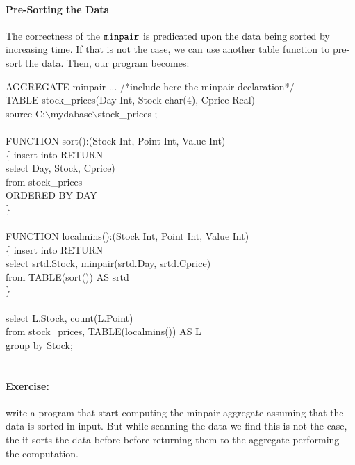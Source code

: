 \paragraph{Pre-Sorting the Data}
The correctness of the $\tt minpair$ is predicated upon the data
being sorted by increasing time. If that is not the case, we can
use another table function to pre-sort the data. Then, our program
becomes:
\begin{codedisplay}
\> {AGGREGATE} minpair  ... /*include here the minpair declaration*/\\
\> TABLE stock\_prices(Day Int, Stock char(4), Cprice Real)\\
\>\>\>\>\>\>\>\>\>\>\>source  C:$\backslash$mydabase$\backslash$stock\_prices ;\\
\>\\
\>FUNCTION sort():(Stock Int, Point Int, Value Int)\\
\>\> \{ \> insert into RETURN\\
\>\>\>select Day, Stock, Cprice)\\
\>\>\>\>from stock\_prices\\
\>\>\>\> ORDERED BY DAY\\
\> \>\> \} \\
\>\\
\>FUNCTION localmins():(Stock Int, Point Int, Value Int)\\
\>\> \{ \> insert into RETURN\\
\>\>\>select srtd.Stock, minpair(srtd.Day, srtd.Cprice)\\
\>\>\>\>from TABLE(sort()) AS srtd\\
\> \>\> \} \\
\>\\
\>select  L.Stock,  count(L.Point)\\
\>\>from  stock\_prices, TABLE(localmins()) AS L\\
\>\>group by Stock; \\
\>\\
\end{codedisplay}

\paragraph{Exercise:} write a program that start computing the minpair aggregate assuming
that the data is sorted in input. But while scanning the data we find this
is not the case, the it sorts the data before before returning them to
the aggregate performing the computation.

